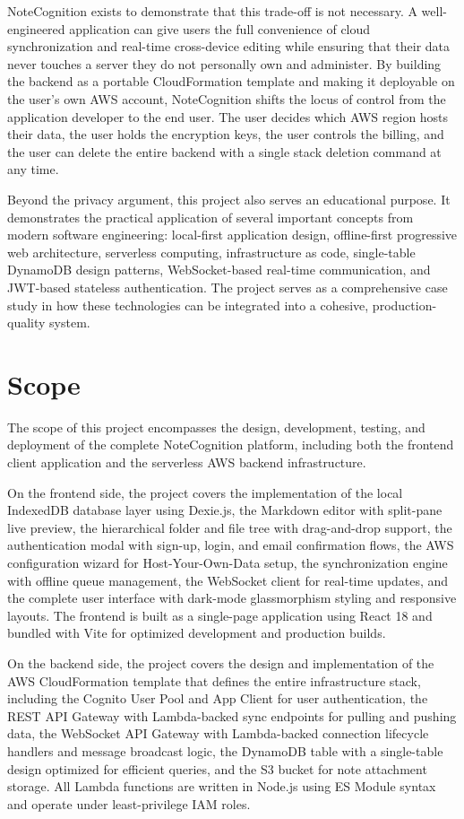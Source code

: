 \documentclass[12pt, a4paper, oneside]{report}
\begin{document}
NoteCognition exists to demonstrate that this trade-off is not necessary. A well-engineered application can give users the full convenience of cloud synchronization and real-time cross-device editing while ensuring that their data never touches a server they do not personally own and administer. By building the backend as a portable CloudFormation template and making it deployable on the user's own AWS account, NoteCognition shifts the locus of control from the application developer to the end user. The user decides which AWS region hosts their data, the user holds the encryption keys, the user controls the billing, and the user can delete the entire backend with a single stack deletion command at any time.

Beyond the privacy argument, this project also serves an educational purpose. It demonstrates the practical application of several important concepts from modern software engineering: local-first application design, offline-first progressive web architecture, serverless computing, infrastructure as code, single-table DynamoDB design patterns, WebSocket-based real-time communication, and JWT-based stateless authentication. The project serves as a comprehensive case study in how these technologies can be integrated into a cohesive, production-quality system.

\section{Scope}

The scope of this project encompasses the design, development, testing, and deployment of the complete NoteCognition platform, including both the frontend client application and the serverless AWS backend infrastructure.

On the frontend side, the project covers the implementation of the local IndexedDB database layer using Dexie.js, the Markdown editor with split-pane live preview, the hierarchical folder and file tree with drag-and-drop support, the authentication modal with sign-up, login, and email confirmation flows, the AWS configuration wizard for Host-Your-Own-Data setup, the synchronization engine with offline queue management, the WebSocket client for real-time updates, and the complete user interface with dark-mode glassmorphism styling and responsive layouts. The frontend is built as a single-page application using React 18 and bundled with Vite for optimized development and production builds.

On the backend side, the project covers the design and implementation of the AWS CloudFormation template that defines the entire infrastructure stack, including the Cognito User Pool and App Client for user authentication, the REST API Gateway with Lambda-backed sync endpoints for pulling and pushing data, the WebSocket API Gateway with Lambda-backed connection lifecycle handlers and message broadcast logic, the DynamoDB table with a single-table design optimized for efficient queries, and the S3 bucket for note attachment storage. All Lambda functions are written in Node.js using ES Module syntax and operate under least-privilege IAM roles.
\end{document}
